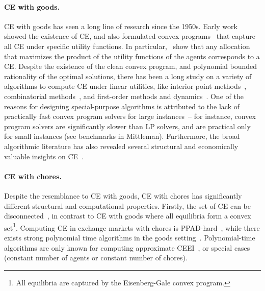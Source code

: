 \documentclass[format=acmsmall,authorversion]{acmart}
\newcommand{\BRC}[1]{{\textcolor{red}{BRC: #1}}}
\begin{document}
\paragraph{CE with goods.} CE with goods has seen a long line of research since the 1950s. Early work~\cite{ArrowD54} showed the existence of CE, and also formulated convex programs~\cite{eisenberg1959consensus} that capture all CE under specific utility functions. In particular,~\cite{eisenberg1959consensus} show that any allocation that maximizes the product of the utility functions of the agents corresponds to a CE. Despite the existence of the clean convex program, and polynomial bounded rationality of the optimal solutions, there has been a long study on a variety of algorithms to compute CE under linear utilities, like interior point methods~\cite{jain2007polynomial, Ye08}, combinatorial methods~\cite{devanur2008market, Orlin10, DuanM15, GV19, ChaudhuryM18}, and first-order methods and dynamics~\cite{birnbaum2011distributed, zhang2011proportional,gao2020first}. One of the reasons for designing special-purpose algorithms is attributed to the lack of practically fast convex program solvers for large instances~\cite{Vazirani12}-- for instance, convex program solvers are significantly slower than LP solvers, and are practical only for small instances (see benchmarks in Mittleman). Furthermore, the broad algorithmic literature has also revealed several structural and economically valuable insights on CE~\cite{DuanGM16, DevanurGV13,  GV19}.   


\paragraph{CE with chores.} Despite the resemblance to CE with goods, CE with chores has significantly different structural and computational properties. Firstly, the set of CE can be disconnected~\cite{BogomolnaiaMSY17}, in contrast to CE with goods where all equilibria form a convex set\footnote{All equilibria are captured by the Eisenberg-Gale convex program.}. Computing CE in exchange markets with chores is PPAD-hard~\cite{ChaudhuryGMM22}, while there exists strong polynomial time algorithms in the goods setting~\cite{GV19}. Polynomial-time algorithms are only known for computing approximate CEEI~\cite{boodaghians2022polynomial, ChaudhuryGMM22}, or special cases~\cite{BS23, GargM20} (constant number of agents or constant number of chores).
\end{document}
